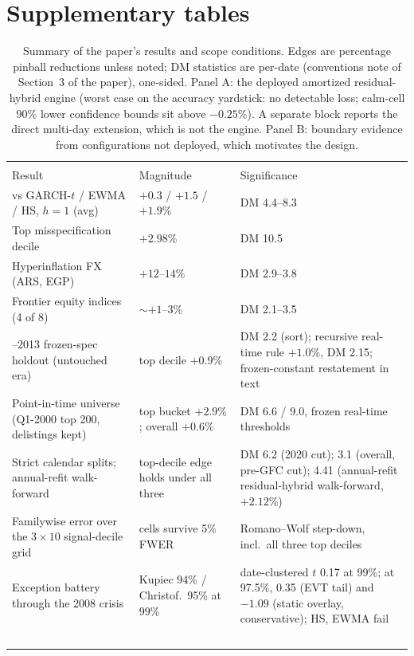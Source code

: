 \documentclass[11pt]{article}
\begin{document}
\section{Supplementary tables}
\begin{table}[htbp]
\centering\small
\begin{threeparttable}
\caption{Summary of the paper's results and scope conditions. Edges are
percentage pinball reductions unless noted; DM statistics are per-date
(conventions note of Section~3 of the paper), one-sided. Panel A: the deployed amortized
residual-hybrid engine (worst case on the accuracy yardstick: no
detectable loss; calm-cell 90\% lower confidence bounds sit above
$-0.25\%$). A separate block reports the direct multi-day
extension, which is not the engine. Panel B: boundary
evidence from configurations not deployed, which motivates the design.}
\label{tab:winloss}
\footnotesize\setlength{\tabcolsep}{3.5pt}
\begin{tabular}{>{\raggedright\arraybackslash}p{}>{\raggedright\arraybackslash}p{}>{\raggedright\arraybackslash}p{}}
\toprule
\multicolumn{3}{l}{\emph{Panel A: the engine}} \\
Result & Magnitude & Significance \\
\midrule
vs GARCH-$t$ / EWMA / HS, $h{=}1$ (avg) & $+0.3$ / $+1.5$ / $+1.9\%$ & DM 4.4--8.3 \\
Top misspecification decile & $+2.98\%$ & DM 10.5 \\
Hyperinflation FX (ARS, EGP) & $+12$--$14\%$ & DM 2.9--3.8 \\
Frontier equity indices (4 of 8) & $\sim$$+1$--$3\%$ & DM 2.1--3.5 \\
2000--2013 frozen-spec holdout (untouched era) & top decile $+0.9\%$ & DM 2.2 (sort); recursive real-time rule $+1.0\%$, DM 2.15; frozen-constant restatement in text \\
Point-in-time universe (Q1-2000 top 200, delistings kept) & top bucket $+2.9\%$; overall $+0.6\%$ & DM 6.6 / 9.0, frozen real-time thresholds \\
Strict calendar splits; annual-refit walk-forward & top-decile edge holds under all three & DM 6.2 (2020 cut); 3.1 (overall, pre-GFC cut); 4.41 (annual-refit residual-hybrid walk-forward, $+2.12\%$) \\
Familywise error over the $3\times10$ signal-decile grid & 9 cells survive 5\% FWER & Romano--Wolf step-down, incl.\ all three top deciles \\
Exception battery through the 2008 crisis & Kupiec 94\% / Christof.\ 95\% at 99\% & date-clustered $t$ 0.17 at 99\%; at 97.5\%, 0.35 (EVT tail) and $-1.09$ (static overlay, conservative); HS, EWMA fail \\
$$
\end{tabular}
\end{threeparttable}
\end{table}
\end{document}
